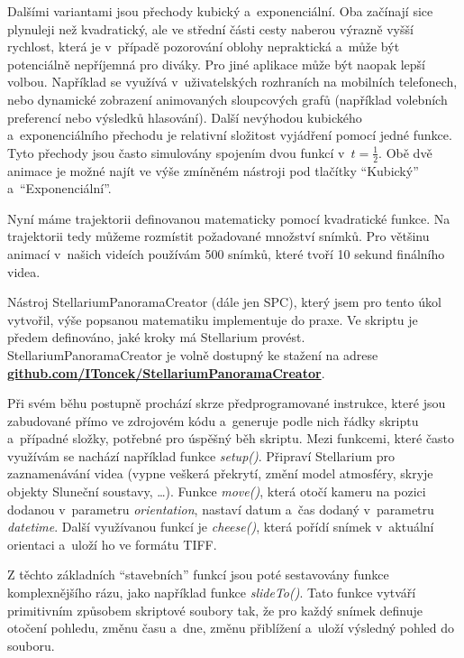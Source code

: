 \documentclass[12pt,a4paper,titlepage]{article}
\newcommand{\link}[2]{\href{#1}{\textcolor{link-color}{\textbf{#2}}}}%
\begin{document}
Dalšími variantami jsou přechody kubický a~exponenciální. Oba začínají sice plynuleji než kvadratický, ale ve střední části cesty naberou výrazně vyšší rychlost, která je v~případě pozorování oblohy nepraktická a~může být potenciálně nepříjemná pro diváky. Pro jiné aplikace může být naopak lepší volbou. Například se využívá v~uživatelských rozhraních na mobilních telefonech, nebo dynamické zobrazení animovaných sloupcových grafů (například volebních preferencí nebo výsledků hlasování). Další nevýhodou kubického a~exponenciálního přechodu je relativní složitost vyjádření pomocí jedné funkce. Tyto přechody jsou často simulovány spojením dvou funkcí v~$t=\frac{1}{2}$. Obě dvě animace je možné najít ve výše zmíněném nástroji pod tlačítky \enquote{Kubický} a~\enquote{Exponenciální}.

Nyní máme trajektorii definovanou matematicky pomocí kvadratické funkce. Na trajektorii tedy můžeme rozmístit požadované množství snímků. Pro většinu animací v~našich videích používám 500 snímků, které tvoří 10 sekund finálního videa.

Nástroj StellariumPanoramaCreator (dále jen SPC), který jsem pro tento úkol vytvořil, výše popsanou matematiku implementuje do praxe. Ve skriptu je předem definováno, jaké kroky má Stellarium provést. StellariumPanoramaCreator je volně dostupný ke stažení na adrese \link{https://github.com/IToncek/StellariumPanoramaCreator}{github.com/IToncek/StellariumPanoramaCreator}. 

Při svém běhu postupně prochází skrze předprogramované instrukce, které jsou zabudované přímo ve zdrojovém kódu a~generuje podle nich řádky skriptu a~případné složky, potřebné pro úspěšný běh skriptu. Mezi funkcemi, které často využívám se nachází například funkce \textit{setup()}. Připraví Stellarium pro zaznamenávání videa (vypne veškerá překrytí, změní model atmosféry, skryje objekty Sluneční soustavy, \ldots). Funkce \textit{move()}, která otočí kameru na pozici dodanou v~parametru \textit{orientation}, nastaví datum a~čas dodaný v~parametru \textit{datetime}. Další využívanou funkcí je \textit{cheese()}, která pořídí snímek v~aktuální orientaci a~uloží ho ve formátu TIFF.%

Z těchto základních \enquote{stavebních} funkcí jsou poté sestavovány funkce komplexnějšího rázu, jako například funkce \textit{slideTo()}. Tato funkce vytváří primitivním způsobem skriptové soubory tak, že pro každý snímek definuje otočení pohledu, změnu času a~dne, změnu přiblížení a~uloží výsledný pohled do souboru. %
\end{document}
